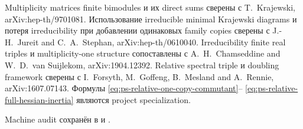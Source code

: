 Multiplicity matrices finite bimodules и их direct sums сверены с
T.~Krajewski, arXiv:hep-th/9701081. Использование irreducible minimal
Krajewski diagrams и потеря irreducibility при добавлении одинаковых family
copies сверены с J.-H.~Jureit and C.~A.~Stephan,
arXiv:hep-th/0610040. Irreducibility finite real triples и multiplicity-one
structure сопоставлены с A.~H.~Chamseddine and W.~D.~van Suijlekom,
arXiv:1904.12392. Relative spectral triple и doubling framework сверены с
I.~Forsyth, M.~Goffeng, B.~Mesland and A.~Rennie,
arXiv:1607.07143. Формулы
\eqref{eq:ps-relative-one-copy-commutant}--
\eqref{eq:ps-relative-full-hessian-inertia} являются project specialization.

Machine audit сохранён в
 и
.